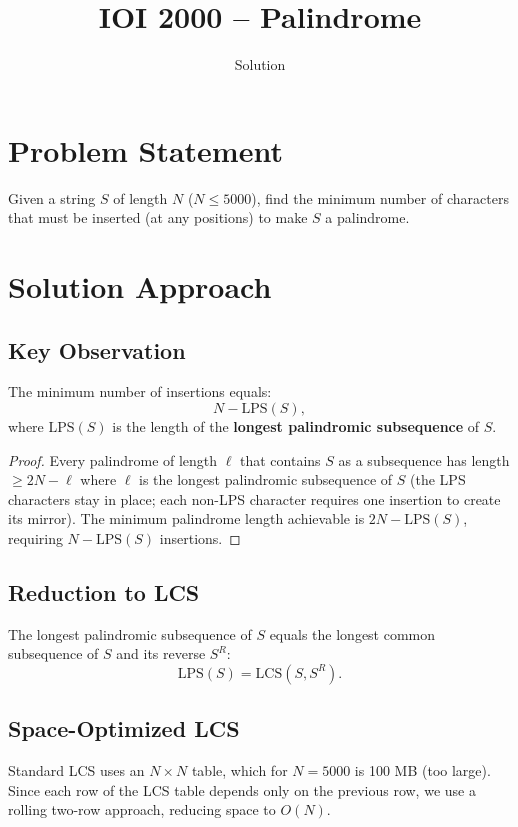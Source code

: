 \documentclass[11pt,a4paper]{article}
\title{IOI 2000 -- Palindrome}
\author{Solution}
\date{}
\begin{document}
\maketitle

\section{Problem Statement}

Given a string $S$ of length $N$ ($N \le 5000$), find the minimum number of
characters that must be inserted (at any positions) to make $S$ a palindrome.

\section{Solution Approach}

\subsection{Key Observation}

The minimum number of insertions equals:
\[
  N - \mathrm{LPS}(S),
\]
where $\mathrm{LPS}(S)$ is the length of the \textbf{longest palindromic subsequence}
of $S$.

\begin{proof}
Every palindrome of length $\ell$ that contains $S$ as a subsequence has length
$\ge 2N - \ell$ where $\ell$ is the longest palindromic subsequence of $S$
(the LPS characters stay in place; each non-LPS character requires one insertion
to create its mirror). The minimum palindrome length achievable is $2N - \mathrm{LPS}(S)$,
requiring $N - \mathrm{LPS}(S)$ insertions.
\end{proof}

\subsection{Reduction to LCS}

The longest palindromic subsequence of $S$ equals the longest common subsequence
of $S$ and its reverse $S^R$:
\[
  \mathrm{LPS}(S) = \mathrm{LCS}(S, S^R).
\]

\subsection{Space-Optimized LCS}

Standard LCS uses an $N \times N$ table, which for $N = 5000$ is 100 MB (too large).
Since each row of the LCS table depends only on the previous row, we use a rolling
two-row approach, reducing space to $O(N)$.
\end{document}
